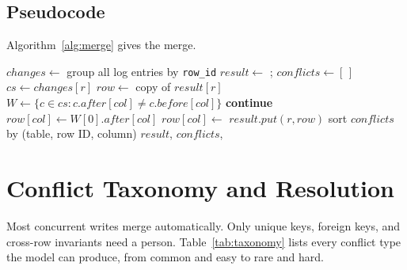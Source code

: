 \documentclass[journal]{IEEEtran}
\begin{document}
\subsection{Pseudocode}
Algorithm~\ref{alg:merge} gives the merge.

\begin{algorithm}[t]
\caption{Deterministic epoch merge}\label{alg:merge}
\small
\begin{algorithmic}[1]
 
 \State $changes \gets$ group all log entries by \texttt{row\_id}
 \State $result \gets$ ; $conflicts \gets [\,]$
  \State $cs \gets changes[r]$
   \State {}
   \State {}
  \Else
   \State $row \gets$ copy of $result[r]$
    \State $W \gets \{c\in cs : c.after[col]\neq c.before[col]\}$
     \textbf{continue} \EndIf
     \State $row[col]\gets W[0].after[col]$
    \Else
     \State $row[col]\gets$ 
    \EndIf
   \EndFor
   \State $result.put(r,row)$
  \EndIf
 \EndFor
 \State {} 
 \State sort $conflicts$ by (table, row ID, column)
 \State \Return $result$, $conflicts$, 
\EndFunction
\end{algorithmic}
\end{algorithm}

\section{Conflict Taxonomy and Resolution}\label{sec:taxonomy}
Most concurrent writes merge automatically. Only unique keys, foreign keys, and cross-row invariants need a person. Table~\ref{tab:taxonomy} lists every conflict type the model can produce, from common and easy to rare and hard.
\end{document}
